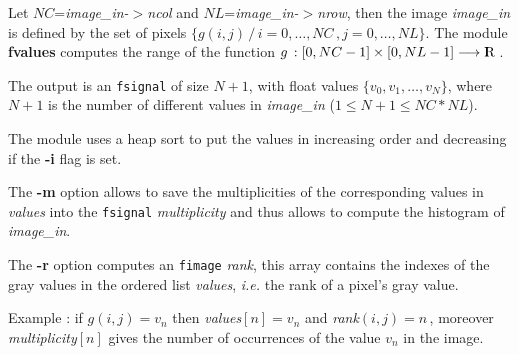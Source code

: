 Let $NC$={\em image\_in-$>$ncol} and $NL$={\em image\_in-$>$nrow}, then
the image {\em image\_in} is defined by the set of pixels
$\{ g(i,j)\, /\, i=0, \ldots, NC\, , j=0, \ldots, NL\}$.
The module {\bf fvalues} computes the range of the function 
$g\,: [0,NC-1]\times[0,NL-1]\longrightarrow {\rm I\!\!R}$\,.

\smallskip

The output is an {\tt fsignal} of size $N+1$, with float values 
$\{v_0, v_1, \ldots, v_N\}$, where $N+1$ is the number of different
values in {\em image\_in} ($1\leq N+1\leq NC*NL$).

\smallskip

The module uses a heap sort to put the values in increasing order
and decreasing if the {\bf -i} flag is set.

\smallskip

The {\bf -m} option allows to save the multiplicities of the 
corresponding values in {\em values} into the {\tt fsignal} 
{\em multiplicity} and thus allows to compute the histogram
of {\em image\_in}.

\smallskip

The {\bf -r} option computes an {\tt fimage} {\em rank}, 
this array contains the indexes of the gray values in 
the ordered list {\em values}, {\em i.e.} the rank of 
a pixel's gray value.

\smallskip

Example : if $g(i,j)=v_n$ then {\em values$[n]=v_n$}
and {\em rank$(i,j)=n$}\,, moreover {\em multiplicity$[n]$}
gives the number of occurrences of the value $v_n$ in the image.
